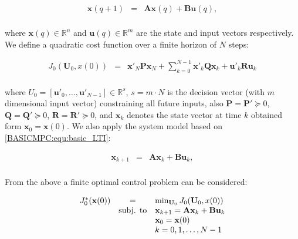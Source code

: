 	    \begin{equation}
        \begin{array}{rcl}
            \textbf{x}(q+1)&=&\textbf{Ax}(q)+\textbf{Bu}(q),\\
        \end{array}
        \label{BASICMPC:equ:basic_LTI}
    \end{equation}

    where $\textbf{x}(q)\in\mathbb{R}^n$ and $\textbf{u}(q)\in\mathbb{R}^m$ are the state and input vectors respectively. We define a quadratic cost function over a finite horizon of $N$ steps:

\begin{equation}
        \begin{array}{rcl}
         J_0(\textbf{U}_0,x(0))&=&\textbf{x}'_N\textbf{P}\textbf{x}_N+\sum^{N-1}_{k=0}\textbf{x}'_k\textbf{Q}\textbf{x}_k+\textbf{u}'_k\textbf{R}\textbf{u}_k\\
        \end{array}
        \label{BASICMPC:equ:cost_function_Euclidian}
    \end{equation}

    where $U_0=[\textbf{u}'_0,\dots,\textbf{u}'_{N-1}]\in\mathbb{R}^s$, $s=m\cdot N$ is the decision vector (with $m$ dimensional input vector) constraining all future inputs, also $\textbf{P}=\textbf{P}'\succeq 0$, $\textbf{Q}=\textbf{Q}'\succeq 0$, $\textbf{R}=\textbf{R}'\succeq 0$, and $\textbf{x}_k$ denotes the state vector at time $k$ obtained form $\textbf{x}_0=\textbf{x}(0)$. We also apply the system model based on \ref{BASICMPC:equ:basic_LTI}:

    \begin{equation}
        \begin{array}{rcl}
            \textbf{x}_{k+1}&=&\textbf{Ax}_k+\textbf{Bu}_k,\\
        \end{array}
        \label{BASICMPC:equ:basic_horizon model}
    \end{equation}

   From the above a finite optimal control problem can be considered:

   \begin{equation}
        \begin{array}{rcl}
         J^*_0(\textbf{x}(0))&=&\min_{\textbf{U}_0}J_0(\textbf{U}_0,x(0))\\
         &\textnormal{subj. to}&\textbf{x}_{k+1}=\textbf{Ax}_k+\textbf{Bu}_k\\
         &&\textbf{x}_0=\textbf{x}(0)\\
         &&k=0,1,\dots,N-1
        \end{array}
        \label{BASICMPC:equ:optimal_control_problem_Euclidian}
    \end{equation}


